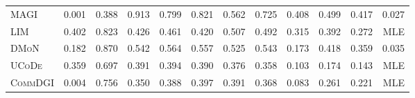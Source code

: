 \documentclass[11pt,a4paper]{article}
\begin{document}
\begin{table}[H]
\begin{tabular*}{\textwidth}{@{\extracolsep{\fill}}l rrrrrrrrrrr@{}}
        \textsc{MAGI} & 0.001 & 0.388 & 0.913 & 0.799 & 0.821 & 0.562 & 0.725 & 0.408 & 0.499 & 0.417 & 0.027 \\
        \textsc{LIM} & 0.402 & 0.823 & 0.426 & 0.461 & 0.420 & 0.507 & 0.492 & 0.315 & 0.392 & 0.272 & MLE \\
        \textsc{DMoN} & 0.182 & 0.870 & 0.542 & 0.564 & 0.557 & 0.525 & 0.543 & 0.173 & 0.418 & 0.359 & 0.035 \\
        \textsc{UCoDe} & 0.359 & 0.697 & 0.391 & 0.394 & 0.390 & 0.376 & 0.358 & 0.103 & 0.174 & 0.143 & MLE \\
        \textsc{CommDGI} & 0.004 & 0.756 & 0.350 & 0.388 & 0.397 & 0.391 & 0.368 & 0.083 & 0.261 & 0.221 & MLE \\
        \bottomrule
    \end{tabular*}
\end{table}
\end{document}
